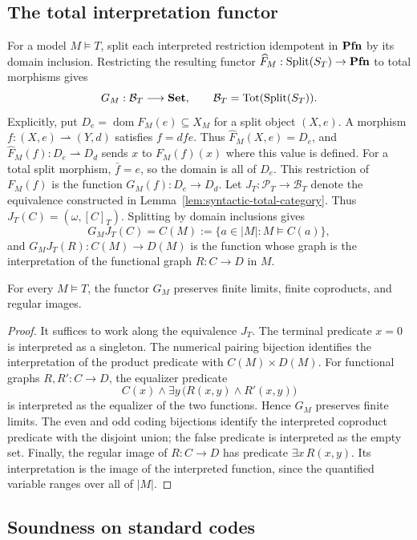 \subsection{The total interpretation functor}

For a model $M\models T$, split each interpreted restriction
idempotent in $\mathbf{Pfn}$ by its domain inclusion. Restricting the resulting
functor $\widehat F_M:\operatorname{Split}(S_T)\to\mathbf{Pfn}$ to total morphisms gives
\[
 G_M:\mathcal B_T\longrightarrow\mathbf{Set},
 \qquad \mathcal B_T=\operatorname{Tot}(\operatorname{Split}(S_T)).
\]
Explicitly, put $D_e=\operatorname{dom}F_M(e)\subseteq X_M$ for a
split object $(X,e)$. A morphism
$f:(X,e)\rightharpoonup(Y,d)$ satisfies $f=dfe$.
Thus $\widehat F_M(X,e)=D_e$, and
$\widehat F_M(f):D_e\rightharpoonup D_d$ sends $x$ to $F_M(f)(x)$
where this value is defined. For a total split morphism,
$\bar f=e$, so the domain is all of $D_e$. This restriction of
$F_M(f)$ is the function $G_M(f):D_e\to D_d$.
Let $J_T:\mathcal P_T\to\mathcal B_T$ denote the equivalence
constructed in Lemma~\ref{lem:syntactic-total-category}. Thus
$J_T(C)=(\omega,[C]_T)$. Splitting by domain inclusions gives
\[
 G_MJ_T(C)=C(M):=\{a\in |M|:M\models C(a)\},
\]
and $G_MJ_T(R):C(M)\to D(M)$ is the function whose graph
is the interpretation of the functional graph $R:C\to D$ in $M$.

\begin{proposition}\label{prop:model-total-regular}
For every $M\models T$, the functor $G_M$ preserves finite limits,
finite coproducts, and regular images.
\end{proposition}
\begin{proof}
It suffices to work along the equivalence $J_T$.
The terminal predicate $x=0$ is interpreted as a singleton.
The numerical pairing bijection identifies the interpretation of
the product predicate with $C(M)\times D(M)$. For functional graphs
$R,R':C\to D$, the equalizer predicate
\[
 C(x)\land\exists y\,
             \bigl(R(x,y)\land R'(x,y)\bigr)
\]
is interpreted as the equalizer of the two functions. Hence $G_M$
preserves finite limits. The even and odd coding bijections identify
the interpreted coproduct predicate with the disjoint union;
the false predicate is interpreted as the empty set. Finally,
the regular image of $R:C\to D$ has predicate
$\exists x\,R(x,y)$. Its interpretation is the image
of the interpreted function, since the quantified variable ranges
over all of $|M|$.
\end{proof}

\subsection{Soundness on standard codes}


